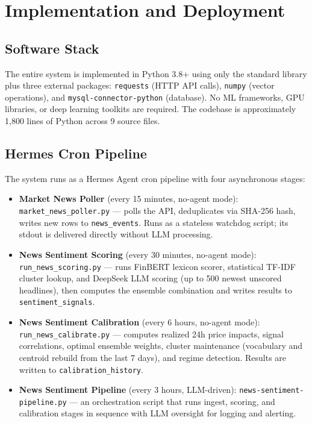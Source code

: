 \section{Implementation and Deployment}
\label{sec:implementation}

\subsection{Software Stack}

The entire system is implemented in Python 3.8+ using only the standard library plus three external packages: \texttt{requests} (HTTP API calls), \texttt{numpy} (vector operations), and \texttt{mysql-connector-python} (database). No ML frameworks, GPU libraries, or deep learning toolkits are required. The codebase is approximately 1,800 lines of Python across 9 source files.

\subsection{Hermes Cron Pipeline}

The system runs as a Hermes Agent cron pipeline with four asynchronous stages:

\begin{itemize}
    \item \textbf{Market News Poller} (every 15 minutes, no-agent mode): \texttt{market\_news\_poller.py} --- polls the API, deduplicates via SHA-256 hash, writes new rows to \texttt{news\_events}. Runs as a stateless watchdog script; its stdout is delivered directly without LLM processing.
    \item \textbf{News Sentiment Scoring} (every 30 minutes, no-agent mode): \texttt{run\_news\_scoring.py} --- runs FinBERT lexicon scorer, statistical TF-IDF cluster lookup, and DeepSeek LLM scoring (up to 500 newest unscored headlines), then computes the ensemble combination and writes results to \texttt{sentiment\_signals}.
    \item \textbf{News Sentiment Calibration} (every 6 hours, no-agent mode): \texttt{run\_news\_calibrate.py} --- computes realized 24h price impacts, signal correlations, optimal ensemble weights, cluster maintenance (vocabulary and centroid rebuild from the last 7 days), and regime detection. Results are written to \texttt{calibration\_history}.
    \item \textbf{News Sentiment Pipeline} (every 3 hours, LLM-driven): \texttt{news-sentiment-pipeline.py} --- an orchestration script that runs ingest, scoring, and calibration stages in sequence with LLM oversight for logging and alerting.
\end{itemize}

